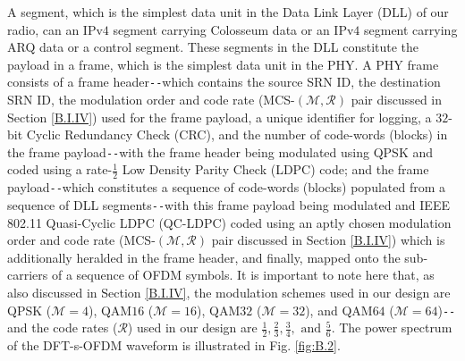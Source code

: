 A segment, which is the simplest data unit in the Data Link Layer (DLL) of our radio, can an IPv$4$ segment carrying Colosseum data or an IPv$4$ segment carrying ARQ data or a control segment. These segments in the DLL constitute the payload in a frame, which is the simplest data unit in the PHY. A PHY frame consists of a frame header\texttt{-{}-}which contains the source SRN ID, the destination SRN ID, the modulation order and code rate (MCS-$(\mathcal{M},\mathcal{R})$ pair discussed in Section \ref{B.I.IV}) used for the frame payload, a unique identifier for logging, a $32$-bit Cyclic Redundancy Check (CRC), and the number of code-words (blocks) in the frame payload\texttt{-{}-}with the frame header being modulated using QPSK and coded using a rate-$\frac{1}{2}$ Low Density Parity Check (LDPC) code; and the frame payload\texttt{-{}-}which constitutes a sequence of code-words (blocks) populated from a sequence of DLL segments\texttt{-{}-}with this frame payload being modulated and IEEE 802.11 Quasi-Cyclic LDPC (QC-LDPC) coded using an aptly chosen modulation order and code rate (MCS-$(\mathcal{M},\mathcal{R})$ pair discussed in Section \ref{B.I.IV}) which is additionally heralded in the frame header, and finally, mapped onto the sub-carriers of a sequence of OFDM symbols. It is important to note here that, as also discussed in Section \ref{B.I.IV}, the modulation schemes used in our design are QPSK ($\mathcal{M}{=}4$), QAM$16$ ($\mathcal{M}{=}16$), QAM$32$ ($\mathcal{M}{=}32$), and QAM$64$ ($\mathcal{M}{=}64$)\texttt{-{}-}and the code rates ($\mathcal{R}$) used in our design are $\frac{1}{2},\frac{2}{3},\frac{3}{4},\text{ and }\frac{5}{6}$. The power spectrum of the DFT-s-OFDM waveform is illustrated in Fig. \ref{fig:B.2}.
